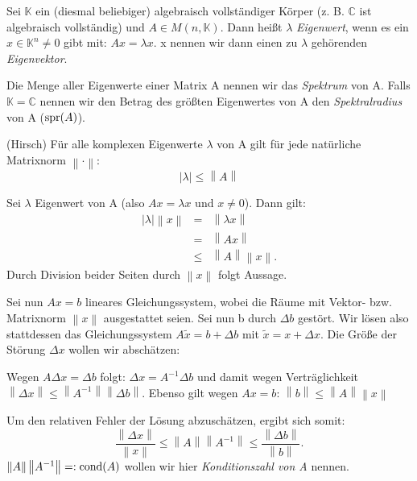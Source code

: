 \documentclass[10pt]{scrbook}
\begin{document}
\begin{Def}
Sei $\mathbb{K}$ ein (diesmal beliebiger) algebraisch vollständiger Körper (z. B. $\mathbb{C}$ ist algebraisch vollständig) und $A\in M(n, \mathbb{K})$. Dann heißt $\lambda$ \emph{Eigenwert}, wenn es ein $x\in\mathbb{K}^n\neq 0$ gibt mit: $A x=\lambda x$. x nennen wir dann einen zu $\lambda$ gehörenden \emph{Eigenvektor}.
\end{Def}

\begin{Def}
Die Menge aller Eigenwerte einer Matrix A nennen wir das \emph{Spektrum} von A. Falls $\mathbb{K}=\mathbb{C}$ nennen wir den Betrag des größten Eigenwertes von A den \emph{Spektralradius} von A ($\operatorname{spr}(A)$).
\end{Def}

\begin{Sa} (Hirsch)
Für alle komplexen Eigenwerte $\lambda$ von A gilt für jede natürliche Matrixnorm $\left\|\cdot\right\|$:
\begin{displaymath}
	\left|\lambda\right|\leq \left\|A\right\|
\end{displaymath}
\end{Sa}
\begin{bew}
Sei $\lambda$ Eigenwert von A (also $A x=\lambda x$ und $x\neq 0$). Dann gilt:
\begin{eqnarray*}
\left|\lambda\right| \left\|x\right\| & = & \left\|\lambda x\right\| \\
& = & \left\|A x\right\| \\
& \leq & \left\|A\right\| \left\|x\right\|.
\end{eqnarray*}
Durch Division beider Seiten durch $\left\|x\right\|$ folgt Aussage.
\end{bew}

Sei nun $A x=b$ lineares Gleichungssystem, wobei die Räume mit Vektor- bzw. Matrixnorm $\left\|x\right\| $ ausgestattet seien. Sei nun b durch $\Delta b$ gestört. Wir lösen also stattdessen das Gleichungssystem $A \widetilde{x}=b+\Delta b$ mit $\widetilde{x}=x+\Delta x$. Die Größe der Störung $\Delta x$ wollen wir abschätzen:

Wegen $A\Delta x=\Delta b$ folgt: $\Delta x=A^{-1} \Delta b$ und damit wegen Verträglichkeit $\left\|\Delta x\right\|\leq\left\|A^{-1}\right\|\left\|\Delta b\right\|$. Ebenso gilt wegen $A x=b$: $\left\|b\right\|\leq\left\|A\right\|\left\|x\right\|$

Um den relativen Fehler der Lösung abzuschätzen, ergibt sich somit:
\begin{displaymath}
	\frac{\left\|\Delta x\right\|}{\left\|x\right\|}\leq \left\|A\right\| \left\|A^{-1}\right\| \leq	\frac{\left\|\Delta b\right\|}{\left\|b\right\|}.
\end{displaymath}
$\left\|A\right\| \left\|A^{-1}\right\|=:\operatorname{cond}(A)$ wollen wir hier \emph{Konditionszahl von A} nennen.
\end{document}
